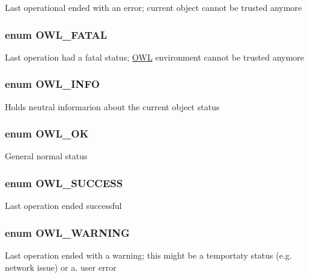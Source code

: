 Last operational ended with an error; current object cannot be trusted anymore \hypertarget{owl_8severitycodes_8php_4c27106ebf80027ef1ebf953ed172e76}{
\subsubsection{\setlength{\rightskip}{0pt plus 5cm}enum {\bf OWL\_\-FATAL}}}
\label{owl_8severitycodes_8php_4c27106ebf80027ef1ebf953ed172e76}


Last operation had a fatal status; \hyperlink{classOWL}{OWL} environment cannot be trusted anymore \hypertarget{owl_8severitycodes_8php_139328861128689f2f4def6a399d9057}{
\subsubsection{\setlength{\rightskip}{0pt plus 5cm}enum {\bf OWL\_\-INFO}}}
\label{owl_8severitycodes_8php_139328861128689f2f4def6a399d9057}


Holds neutral informarion about the current object status \hypertarget{owl_8severitycodes_8php_bc72c053cfd10025fe57797c41eab18e}{
\subsubsection{\setlength{\rightskip}{0pt plus 5cm}enum {\bf OWL\_\-OK}}}
\label{owl_8severitycodes_8php_bc72c053cfd10025fe57797c41eab18e}


General normal status \hypertarget{owl_8severitycodes_8php_96223f06ba27bf5cbefa6e9d702897c2}{
\subsubsection{\setlength{\rightskip}{0pt plus 5cm}enum {\bf OWL\_\-SUCCESS}}}
\label{owl_8severitycodes_8php_96223f06ba27bf5cbefa6e9d702897c2}


Last operation ended successful \hypertarget{owl_8severitycodes_8php_ce886152e2e86cd2e91cb833fd495adb}{
\subsubsection{\setlength{\rightskip}{0pt plus 5cm}enum {\bf OWL\_\-WARNING}}}
\label{owl_8severitycodes_8php_ce886152e2e86cd2e91cb833fd495adb}


Last operation ended with a warning; this might be a temportaty status (e.g. network issue) or a. user error 